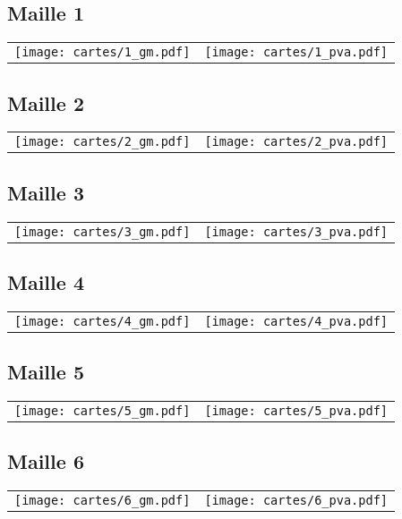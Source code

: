 \subsection{Maille 1}
\begin{tabular}{ll}
\texttt{[image: cartes/1\_gm.pdf]}
&
\texttt{[image: cartes/1\_pva.pdf]}
\end{tabular}
\newpage
\subsection{Maille 2}
\begin{tabular}{ll}
\texttt{[image: cartes/2\_gm.pdf]}
&
\texttt{[image: cartes/2\_pva.pdf]}
\end{tabular}
\newpage
\subsection{Maille 3}
\begin{tabular}{ll}
\texttt{[image: cartes/3\_gm.pdf]}
&
\texttt{[image: cartes/3\_pva.pdf]}
\end{tabular}
\newpage
\subsection{Maille 4}
\begin{tabular}{ll}
\texttt{[image: cartes/4\_gm.pdf]}
&
\texttt{[image: cartes/4\_pva.pdf]}
\end{tabular}
\newpage
\subsection{Maille 5}
\begin{tabular}{ll}
\texttt{[image: cartes/5\_gm.pdf]}
&
\texttt{[image: cartes/5\_pva.pdf]}
\end{tabular}
\newpage
\subsection{Maille 6}
\begin{tabular}{ll}
\texttt{[image: cartes/6\_gm.pdf]}
&
\texttt{[image: cartes/6\_pva.pdf]}
\end{tabular}
\newpage
